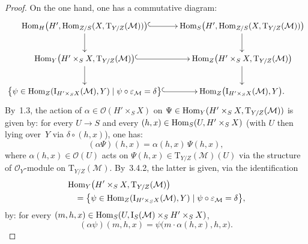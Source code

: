 \begin{proof}
On the one hand, one has a commutative diagram:
\[
\xymatrix@C=1.6em@R=2.2em{
\Hom_{H}\bigl(H',\Hom_{Z/S}(X,\mathrm{T}_{Y/Z}(\mathcal{M}))\bigr)
  \ar@{^{(}->}[r]\ar[d]
& \Hom_{S}\bigl(H',\Hom_{Z/S}(X,\mathrm{T}_{Y/Z}(\mathcal{M}))\bigr)\ar[d]\\
\Hom_{Y}\bigl(H'\times_{S}X,\mathrm{T}_{Y/Z}(\mathcal{M})\bigr)
  \ar@{^{(}->}[r]\ar[d]
& \Hom_{Z}\bigl(H'\times_{S}X,\mathrm{T}_{Y/Z}(\mathcal{M})\bigr)\ar[d]\\
\bigl\{\psi\in\Hom_{Z}(\mathrm{I}_{H'\times_{S}X}(\mathcal{M}),Y)
  \mid\psi\circ\varepsilon_{\mathcal{M}}=\delta\bigr\}
  \ar@{^{(}->}[r]
& \Hom_{Z}\bigl(\mathrm{I}_{H'\times_{S}X}(\mathcal{M}),Y\bigr).
}
\]
By~1.3, the action of \(\alpha\in\mathcal{O}(H'\times_{S}X)\) on
\(\Psi\in\operatorname{Hom}_{Y}(H'\times_{S}X,\mathrm{T}_{Y/Z}(\mathcal{M}))\) is given by:
for every \(U\to S\) and every
\((h,x)\in\operatorname{Hom}_{S}(U,H'\times_{S}X)\) (with \(U\) then lying over~\(Y\) via
\(\delta\circ(h,x)\)), one has:
\[
(\alpha\Psi)(h,x)=\alpha(h,x)\,\Psi(h,x),
\]
where \(\alpha(h,x)\in\mathcal{O}(U)\) acts on
\(\Psi(h,x)\in\mathrm{T}_{Y/Z}(\mathcal{M})(U)\) via the structure of
\(\mathcal{O}_{Y}\)-module on \(\mathrm{T}_{Y/Z}(\mathcal{M})\). By~3.4.2,
the latter is given, via the identification
\[
\begin{aligned}
&\operatorname{Hom}_{Y}\bigl(H'\times_{S}X,\mathrm{T}_{Y/Z}(\mathcal{M})\bigr)\\
&\quad=
\bigl\{\psi\in\operatorname{Hom}_{Z}(\mathrm{I}_{H'\times_{S}X}(\mathcal{M}),Y)
\mid\psi\circ\varepsilon_{\mathcal{M}}=\delta\bigr\},
\end{aligned}
\]
by: for every
\((m,h,x)\in\operatorname{Hom}_{S}(U,\mathrm{I}_{S}(\mathcal{M})\times_{S}H'\times_{S}X)\),
\begin{equation}
(\alpha\psi)(m,h,x)=\psi\bigl(m\cdot\alpha(h,x),h,x\bigr).
\tag{1}
\end{equation}


\end{proof}

